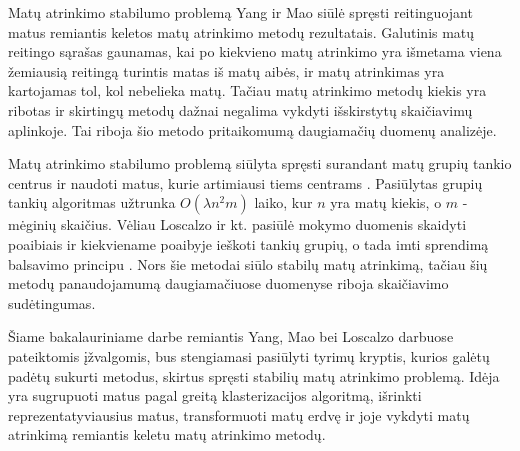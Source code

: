 

Matų atrinkimo stabilumo problemą Yang ir Mao \cite{yang2011robust} siūlė spręsti reitinguojant matus remiantis keletos matų atrinkimo metodų rezultatais. Galutinis matų reitingo sąrašas gaunamas, kai po kiekvieno matų atrinkimo yra išmetama viena žemiausią reitingą turintis matas iš matų aibės, ir matų atrinkimas yra kartojamas tol, kol nebelieka matų. Tačiau matų atrinkimo metodų kiekis yra ribotas ir skirtingų metodų dažnai negalima vykdyti išskirstytų skaičiavimų aplinkoje. Tai riboja šio metodo pritaikomumą daugiamačių duomenų analizėje.

Matų atrinkimo stabilumo problemą siūlyta spręsti surandant matų grupių tankio centrus ir naudoti matus, kurie artimiausi tiems centrams \cite{yu2008stable}. Pasiūlytas grupių tankių algoritmas užtrunka $O(\lambda n^2m)$ laiko, kur $n$ yra matų kiekis, o $m$ - mėginių skaičius. Vėliau Loscalzo ir kt. pasiūlė mokymo duomenis skaidyti poaibiais ir kiekviename poaibyje ieškoti tankių grupių, o tada imti sprendimą balsavimo principu \cite{loscalzo2009consensus}. Nors šie metodai siūlo stabilų matų atrinkimą, tačiau šių metodų panaudojamumą daugiamačiuose duomenyse riboja skaičiavimo sudėtingumas.

Šiame bakalauriniame darbe remiantis Yang, Mao bei Loscalzo darbuose pateiktomis įžvalgomis, bus stengiamasi pasiūlyti tyrimų kryptis, kurios galėtų padėtų sukurti metodus, skirtus spręsti stabilių matų atrinkimo problemą. Idėja yra sugrupuoti matus pagal greitą klasterizacijos algoritmą, išrinkti reprezentatyviausius matus, transformuoti matų erdvę ir joje vykdyti matų atrinkimą remiantis keletu matų atrinkimo metodų.

